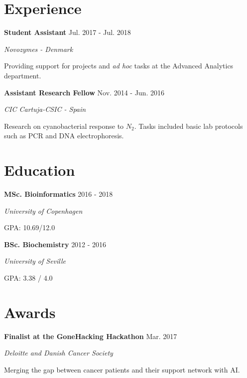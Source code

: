 \documentclass[paper=a4,fontsize=11pt]{article}
\newcommand{\NewPart}[1]{
\vspace{-15pt}
\section*{
{#1}}}
\newcommand{\Entry}[4]{
		\noindent \textbf{#1} \hfill      %
		{\color{gray}\textsf{#2}} \par                  %
		\noindent \textit{#3} \par        %
		  \noindent \small #4  %
		\normalsize \par \vspace{7.5pt}}
\begin{document}

%




\NewPart{Experience}

\Entry{Student Assistant}{Jul. 2017 - Jul. 2018}{Novozymes - Denmark}{Providing support for projects and \textit{ad hoc} tasks at the Advanced Analytics department.}

\Entry{Assistant Research Fellow}{Nov. 2014 - Jun. 2016}{CIC Cartuja-CSIC  - Spain}{Research on cyanobacterial response to $N_2$. Tasks included basic lab protocols such as PCR and DNA electrophoresis.}


\NewPart{Education}

\Entry{MSc. Bioinformatics}{2016 - 2018}{University of Copenhagen}{GPA: 10.69/12.0}

\Entry{BSc. Biochemistry}{2012 - 2016}{University of Seville}{GPA: 3.38 / 4.0}



\NewPart{Awards}

\Entry{Finalist at the GoneHacking Hackathon}{Mar. 2017}{Deloitte and Danish Cancer Society}{Merging the gap between cancer patients and their support network with AI.}
\end{document}
